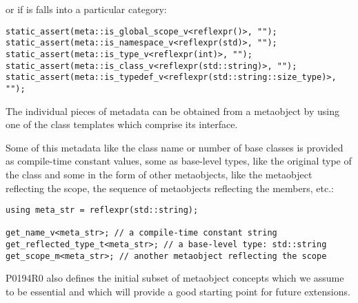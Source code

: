 or if is falls into a particular category:

\begin{verbatim}
static_assert(meta::is_global_scope_v<reflexpr()>, "");
static_assert(meta::is_namespace_v<reflexpr(std)>, "");
static_assert(meta::is_type_v<reflexpr(int)>, "");
static_assert(meta::is_class_v<reflexpr(std::string)>, "");
static_assert(meta::is_typedef_v<reflexpr(std::string::size_type)>, "");
\end{verbatim}

The individual pieces of metadata can be obtained from a metaobject by using one
of the class templates which comprise its interface.

Some of this metadata like the class name or number of base classes is provided
as compile-time constant values, some as base-level types, like the original
type of the class and some in the form of other metaobjects, like the metaobject
reflecting the scope, the sequence of metaobjects reflecting the members, etc.:

\begin{verbatim}
using meta_str = reflexpr(std::string);

get_name_v<meta_str>; // a compile-time constant string
get_reflected_type_t<meta_str>; // a base-level type: std::string
get_scope_m<meta_str>; // another metaobject reflecting the scope
\end{verbatim}

P0194R0 also defines the initial subset
of metaobject concepts which we assume to be essential
and which will provide a good starting point for future extensions.

